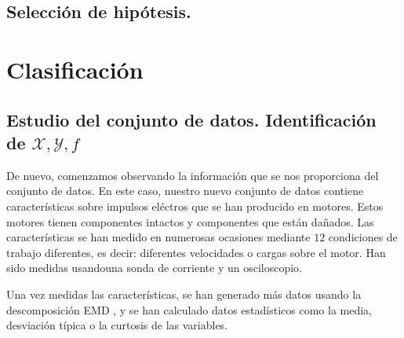 \documentclass[a4paper, 20pt]{article}
\begin{document}
\subsection{Selección de hipótesis.}

\newpage

\section{Clasificación}

\subsection{Estudio del conjunto de datos. Identificación de $\mathcal X, \mathcal Y, f$}

De nuevo, comenzamos observando la información que se nos proporciona del conjunto de datos. En este caso, nuestro nuevo conjunto de datos \cite{noauthor_uci_nodate} contiene características sobre impulsos eléctros que se han producido en motores. Estos motores tienen componentes intactos y componentes que están dañados. Las características se han medido en numerosas ocasiones mediante $12$ condiciones de trabajo diferentes, es decir: diferentes velocidades o cargas sobre el motor. Han sido medidas usandouna sonda de corriente y un osciloscopio.

Una vez medidas las características, se han generado más datos usando la descomposición EMD \cite{noauthor_hilberthuang_2021}, y se han calculado datos estadísticos como la media, desviación típica o la curtosis de las variables.




\newpage
\printbibliography
\end{document}
